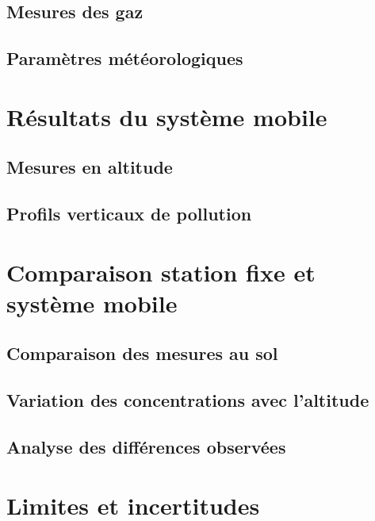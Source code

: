 \subsection{Mesures des gaz}

\subsection{Paramètres météorologiques}

\section{Résultats du système mobile}

\subsection{Mesures en altitude}

\subsection{Profils verticaux de pollution}

\section{Comparaison station fixe et système mobile}

\subsection{Comparaison des mesures au sol}

\subsection{Variation des concentrations avec l'altitude}

\subsection{Analyse des différences observées}

\section{Limites et incertitudes}

